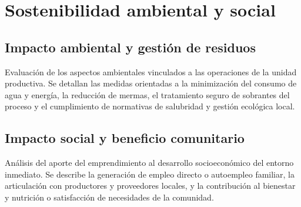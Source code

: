 \section{Sostenibilidad ambiental y social}
\label{sec:sostenibilidad_ambiental_social}

\subsection{Impacto ambiental y gestión de residuos}
Evaluación de los aspectos ambientales vinculados a las operaciones de la unidad productiva. Se detallan las medidas orientadas a la minimización del consumo de agua y energía, la reducción de mermas, el tratamiento seguro de sobrantes del proceso y el cumplimiento de normativas de salubridad y gestión ecológica local.

\subsection{Impacto social y beneficio comunitario}
Análisis del aporte del emprendimiento al desarrollo socioeconómico del entorno inmediato. Se describe la generación de empleo directo o autoempleo familiar, la articulación con productores y proveedores locales, y la contribución al bienestar y nutrición o satisfacción de necesidades de la comunidad.
